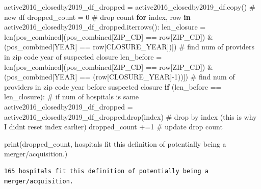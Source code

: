 \documentclass[
  letterpaper,
  DIV=11,
  numbers=noendperiod]{scrartcl}
\newenvironment{Shaded}{\begin{snugshade}}{\end{snugshade}}
\newcommand{\BuiltInTok}[1]{\textcolor[rgb]{0.00,0.23,0.31}{#1}}
\newcommand{\CommentTok}[1]{\textcolor[rgb]{0.37,0.37,0.37}{#1}}
\newcommand{\ControlFlowTok}[1]{\textcolor[rgb]{0.00,0.23,0.31}{\textbf{#1}}}
\newcommand{\DecValTok}[1]{\textcolor[rgb]{0.68,0.00,0.00}{#1}}
\newcommand{\KeywordTok}[1]{\textcolor[rgb]{0.00,0.23,0.31}{\textbf{#1}}}
\newcommand{\NormalTok}[1]{\textcolor[rgb]{0.00,0.23,0.31}{#1}}
\newcommand{\OperatorTok}[1]{\textcolor[rgb]{0.37,0.37,0.37}{#1}}
\newcommand{\StringTok}[1]{\textcolor[rgb]{0.13,0.47,0.30}{#1}}
\begin{document}
\begin{Shaded}
\begin{Highlighting}[]
\NormalTok{active2016\_closedby2019\_df\_dropped }\OperatorTok{=}\NormalTok{ active2016\_closedby2019\_df.copy() }\CommentTok{\# new df}
\NormalTok{dropped\_count }\OperatorTok{=} \DecValTok{0} \CommentTok{\# drop count}
\ControlFlowTok{for}\NormalTok{ index, row }\KeywordTok{in}\NormalTok{ active2016\_closedby2019\_df\_dropped.iterrows():}
\NormalTok{  len\_closure }\OperatorTok{=} \BuiltInTok{len}\NormalTok{(pos\_combined[(pos\_combined[}\StringTok{\textquotesingle{}ZIP\_CD\textquotesingle{}}\NormalTok{] }\OperatorTok{==}\NormalTok{ row[}\StringTok{\textquotesingle{}ZIP\_CD\textquotesingle{}}\NormalTok{]) }\OperatorTok{\&}\NormalTok{ (pos\_combined[}\StringTok{\textquotesingle{}YEAR\textquotesingle{}}\NormalTok{] }\OperatorTok{==}\NormalTok{ row[}\StringTok{\textquotesingle{}CLOSURE\_YEAR\textquotesingle{}}\NormalTok{])]) }\CommentTok{\# find num of providers in zip code year of suspected closure}
\NormalTok{  len\_before }\OperatorTok{=} \BuiltInTok{len}\NormalTok{(pos\_combined[(pos\_combined[}\StringTok{\textquotesingle{}ZIP\_CD\textquotesingle{}}\NormalTok{] }\OperatorTok{==}\NormalTok{ row[}\StringTok{\textquotesingle{}ZIP\_CD\textquotesingle{}}\NormalTok{]) }\OperatorTok{\&}\NormalTok{ (pos\_combined[}\StringTok{\textquotesingle{}YEAR\textquotesingle{}}\NormalTok{] }\OperatorTok{==}\NormalTok{ (row[}\StringTok{\textquotesingle{}CLOSURE\_YEAR\textquotesingle{}}\NormalTok{]}\OperatorTok{{-}}\DecValTok{1}\NormalTok{))]) }\CommentTok{\# find num of providers in zip code year before suspected closure}
  \ControlFlowTok{if}\NormalTok{ (len\_before }\OperatorTok{==}\NormalTok{ len\_closure): }\CommentTok{\# if num of hospitals is same}
\NormalTok{      active2016\_closedby2019\_df\_dropped }\OperatorTok{=}\NormalTok{ active2016\_closedby2019\_df\_dropped.drop(index) }\CommentTok{\# drop by index (this is why I didn\textquotesingle{}t reset index earlier)  }
\NormalTok{      dropped\_count }\OperatorTok{+=}\DecValTok{1} \CommentTok{\# update drop count}

\BuiltInTok{print}\NormalTok{(dropped\_count, }\StringTok{\textquotesingle{}hospitals fit this definition of potentially being a merger/acquisition.\textquotesingle{}}\NormalTok{)}
\end{Highlighting}
\end{Shaded}

\begin{verbatim}
165 hospitals fit this definition of potentially being a merger/acquisition.
\end{verbatim}
\end{document}
